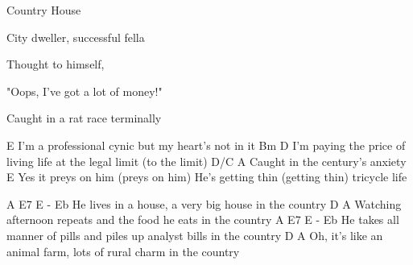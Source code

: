 \begin{song}{Country House}{
	
	\chordset[Verse]{ \AMaj \EMaj \Bm \DMaj \DMajBassCsh }

	\chordset[Chorus]{ \AMajShE \ESevenShA \EMajShA \DshShA \DMajShA}
	\vspace{1em}
}

\begin{songverse*}[Intro]
 \hspace{10pt}  \hspace{10pt}   \hspace{15pt}   \hspace{10pt}   \hspace{20pt}  
\end{songverse*}

\begin{songverse}
City dweller, successful fella

Thought to himself, 

"Oops, I've got a lot of money!"

                             
Caught in a rat race terminally 


                                E
I'm a professional cynic but my heart's not in it
    Bm                                               D
I'm paying the price of living life at the legal limit (to the limit)
              D/C              A 
Caught in the century's anxiety 
       E
Yes it preys on him (preys on him)
He's getting thin (getting thin) {tricycle life}
\end{songverse}

\begin{songchorus}                                 

 A                                            E7       E - Eb      
He lives in a house, a very big house in the country 
         D                                             A
Watching afternoon repeats and the food he eats in the country
             A                                                 E7      E - Eb
He takes all manner of pills and piles up analyst bills in the country
                 D                                       A 
Oh, it's like an animal farm, lots of rural charm in the country 

\end{songchorus}
 
 \begin{songverse}
                          

\end{songverse}
\end{song}
